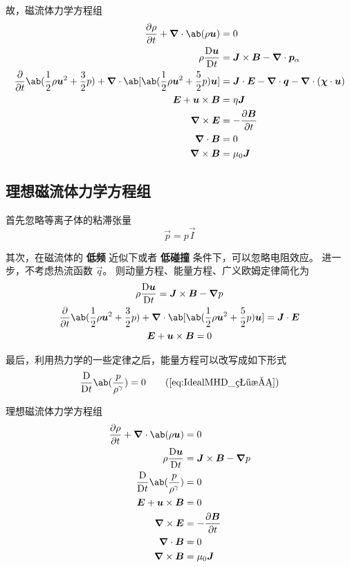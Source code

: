 故，磁流体力学方程组
\begin{subequations}\begin{align}
\pdv{\rho}{t} + \dive{\ab(\rho \vec{u})} &= 0 \\
\rho \mdv{\vec{u}}{t} &= \vec{J} \times \vec{B} - \dive{\vec{p}_\alpha} \\
\pdv{}{t} \ab(
    \frac{1}{2} \rho \vec{u}^2 + \frac{3}{2} p
)
+ \dive{\ab[\ab(\frac{1}{2} \rho \vec{u}^2 + \frac{5}{2} p ) \vec{u} ]}
&= \vec{J} \cdot \vec{E}
- \dive{\vec{q}} - \dive{(\vec{\chi} \cdot \vec{u})} \\
\vec{E} + \vec{u} \times \vec{B} &= \eta \vec{J} \\
\curl{\vec{E}} &= - \pdv{\vec{B}}{t} \\
\dive{\vec{B}} &= 0 \\
\curl{\vec{B}} &= \mu_0 \vec{J} \label{eq:02MHD_欧姆}
\end{align}\end{subequations}

\subsection{理想磁流体力学方程组}

首先忽略等离子体的粘滞张量
\begin{equation}
\vec{p} = p \vec{I}
\end{equation}

其次，在磁流体的 \textbf{低频} 近似下或者 \textbf{低碰撞} 条件下，可以忽略电阻效应。
进一步，不考虑热流函数 $\vec{q}$。
则动量方程、能量方程、广义欧姆定律简化为
\begin{gather}
\rho \mdv{\vec{u}}{t} = \vec{J} \times \vec{B} - \grad{p} \\
\pdv{}{t} \ab(
    \frac{1}{2} \rho \vec{u}^2 + \frac{3}{2} p
)
+ \dive{\ab[\ab(\frac{1}{2} \rho \vec{u}^2 + \frac{5}{2} p ) \vec{u} ]}
= \vec{J} \cdot \vec{E} \\
\vec{E} + \vec{u} \times \vec{B} = 0
\end{gather}

最后，利用热力学的一些定律之后，能量方程可以改写成如下形式
\begin{equation}
\mdv{}{t} \ab(\frac{p}{\rho^\gamma}) = 0 \tag{\ref{eq:IdealMHD_状态}}
\end{equation}

理想磁流体力学方程组
\begin{subequations}\begin{align}
\pdv{\rho}{t} + \dive{\ab(\rho \vec{u})} &= 0 \label{eq:IdealMHD_质量}\\
\rho \mdv{\vec{u}}{t} &= \vec{J} \times \vec{B} - \grad{p} \label{eq:IdealMHD_动量}\\
\mdv{}{t} \ab(\frac{p}{\rho^\gamma}) &= 0 \label{eq:IdealMHD_状态}\\
\vec{E} + \vec{u} \times \vec{B} &= 0 \label{eq:IdealMHD_欧姆}\\
\curl{\vec{E}} &= - \pdv{\vec{B}}{t} \label{eq:IdealMHD_电场}\\
\dive{\vec{B}} &= 0 \label{eq:IdealMHD_磁场}\\
\curl{\vec{B}} &= \mu_0 \vec{J} \label{eq:IdealMHD_电流}
\end{align}\end{subequations}

